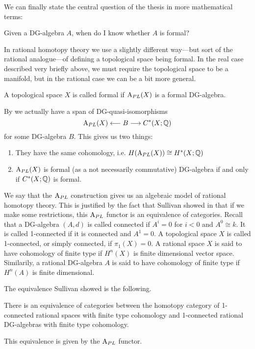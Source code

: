 We can finally state the central question of the thesis in more mathematical terms:
\begin{central}
Given a DG-algebra $A$, when do I know whether $A$ is formal? 
\end{central}

In rational homotopy theory we use a slightly different way---but sort of the rational analogue---of defining a topological space being formal. In the real case described very briefly above, we must require the topological space to be a manifold, but in the rational case we can be a bit more general. 


\begin{definition}
A topological space $X$ is called formal if $\text{A}_{PL}(X)$ is a formal DG-algebra. 
\end{definition}

By \cite[Corollary 10.10]{FHT} we actually have a span of DG-quasi-isomorphisms 
\begin{equation*}
    \text{A}_{PL}(X)\longleftarrow B \longrightarrow C^*(X;\mathbb{Q})
\end{equation*}
for some DG-algebra $B$. This gives us two things:
\begin{enumerate}
    \item They have the same cohomology, i.e. $H(\text{A}_{PL}(X)) \cong H^*(X;\mathbb{Q})$
    \item $\text{A}_{PL}(X)$ is formal (as a not necessarily commutative) DG-algebra if and only if $C^*(X;\mathbb{Q})$ is formal. 
\end{enumerate}

We say that the $\text{A}_{PL}$ construction gives us an algebraic model of rational homotopy theory. This is justified by the fact that Sullivan showed in \cite{Sullivan} that if we make some restrictions, this $\text{A}_{PL}$ functor is an equivalence of categories. Recall that a DG-algebra $(A, d)$ is called connected if $A^i = 0$ for $i< 0$ and $A^0\cong k$. It is called 1-connected if it is connected and $A^1=0$. A topological space $X$ is called 1-connected, or simply connected, if $\pi_1(X)=0$. A rational space $X$ is said to have cohomology of finite type if $H^n(X)$ is finite dimensional vector space. Similarily, a rational DG-algebra $A$ is said to have cohomology of finite type if $H^n(A)$ is finite dimensional. 

The equivalence Sullivan showed is the following.

\begin{theorem}
There is an equivalence of categories between the homotopy category of 1-connected rational spaces with finite type cohomology and 1-connected rational DG-algebras with finite type cohomology. 

This equivalence is given by the $\text{A}_{PL}$ functor. 
\end{theorem}

